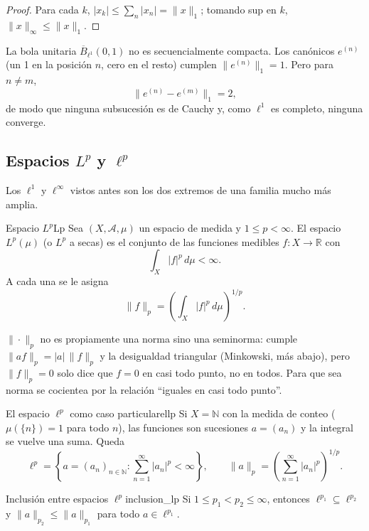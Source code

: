 \documentclass[11pt, a4paper]{article}
\begin{document}
\begin{proof}
Para cada $k$, $|x_k| \le \sum_n |x_n| = \|x\|_1$; tomando sup en $k$, $\|x\|_\infty \le \|x\|_1$.
\end{proof}

\begin{ejemplo}{}{}
La bola unitaria $\overline{B}_{\ell^1}(0,1)$ no es secuencialmente compacta. Los canónicos
$e^{(n)}$ (un 1 en la posición $n$, cero en el resto) cumplen $\|e^{(n)}\|_1 = 1$. Pero para
$n \ne m$,
$$ \|e^{(n)} - e^{(m)}\|_1 = 2, $$
de modo que ninguna subsucesión es de Cauchy y, como $\ell^1$ es completo, ninguna converge.
\end{ejemplo}

\subsection{\texorpdfstring{Espacios $L^p$ y $\ell^p$}{Espacios Lp y lp}}

Los $\ell^1$ y $\ell^\infty$ vistos antes son los dos extremos de una familia mucho más amplia.

\begin{definicion}{Espacio $L^p$}{Lp}
Sea $(X, \mathcal{A}, \mu)$ un espacio de medida y $1 \le p < \infty$. El espacio $L^p(\mu)$ (o
$L^p$ a secas) es el conjunto de las funciones medibles $f: X \to \mathbb{R}$ con
$$ \int_X |f|^p \, d\mu < \infty. $$
A cada una se le asigna
$$ \|f\|_p = \left( \int_X |f|^p \, d\mu \right)^{1/p}. $$
\end{definicion}

\obs
$\|\cdot\|_p$ no es propiamente una norma sino una seminorma: cumple $\|af\|_p = |a|\,\|f\|_p$ y la
desigualdad triangular (Minkowski, más abajo), pero $\|f\|_p = 0$ solo dice que $f = 0$ en casi todo punto, no
en todos. Para que sea norma se cocientea por la relación ``iguales en casi todo punto''.

\begin{ejemplo}{El espacio $\ell^p$ como caso particular}{ellp}
Si $X = \mathbb{N}$ con la medida de conteo ($\mu(\{n\}) = 1$ para todo $n$), las funciones son
sucesiones $a = (a_n)$ y la integral se vuelve una suma. Queda
$$ \ell^p = \left\{ a = (a_n)_{n \in \mathbb{N}} : \sum_{n=1}^{\infty} |a_n|^p < \infty \right\},
\qquad \|a\|_p = \left( \sum_{n=1}^{\infty} |a_n|^p \right)^{1/p}. $$
\end{ejemplo}

\begin{proposicion}{Inclusión entre espacios $\ell^p$}{inclusion_lp}
Si $1 \le p_1 < p_2 \le \infty$, entonces $\ell^{p_1} \subseteq \ell^{p_2}$ y
$\|a\|_{p_2} \le \|a\|_{p_1}$ para todo $a \in \ell^{p_1}$.
\end{proposicion}
\end{document}
